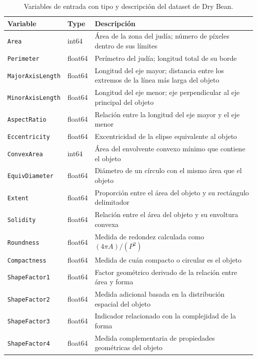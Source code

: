 \documentclass[11pt,a4paper]{article}
\begin{document}
\begin{table}[H]
\centering
\small
{}

\begin{tabular}{p{3.5cm} p{2cm} p{8cm}}
\toprule
\textbf{Variable} & \textbf{Type} & \textbf{Descripción} \\
\midrule

\texttt{Area} & int64 & Área de la zona del judía; número de píxeles dentro de sus límites \\
\texttt{Perimeter} & float64 & Perímetro del judía; longitud total de su borde \\
\texttt{MajorAxisLength} & float64 & Longitud del eje mayor; distancia entre los extremos de la línea más larga del objeto \\
\texttt{MinorAxisLength} & float64 & Longitud del eje menor; eje perpendicular al eje principal del objeto \\
\texttt{AspectRatio} & float64 & Relación entre la longitud del eje mayor y el eje menor \\
\texttt{Eccentricity} & float64 & Excentricidad de la elipse equivalente al objeto \\
\texttt{ConvexArea} & int64 & Área del envolvente convexo mínimo que contiene el objeto \\
\texttt{EquivDiameter} & float64 & Diámetro de un círculo con el mismo área que el objeto \\
\texttt{Extent} & float64 & Proporción entre el área del objeto y su rectángulo delimitador \\
\texttt{Solidity} & float64 & Relación entre el área del objeto y su envoltura convexa \\
\texttt{Roundness} & float64 & Medida de redondez calculada como $(4\pi A)/(P^2)$ \\
\texttt{Compactness} & float64 & Medida de cuán compacto o circular es el objeto \\
\texttt{ShapeFactor1} & float64 & Factor geométrico derivado de la relación entre área y forma \\
\texttt{ShapeFactor2} & float64 & Medida adicional basada en la distribución espacial del objeto \\
\texttt{ShapeFactor3} & float64 & Indicador relacionado con la complejidad de la forma \\
\texttt{ShapeFactor4} & float64 & Medida complementaria de propiedades geométricas del objeto \\

\bottomrule
\end{tabular}

\caption{Variables de entrada con tipo y descripción del dataset de Dry Bean.}
\label{tab:drybean_variables}
\end{table}
\end{document}
